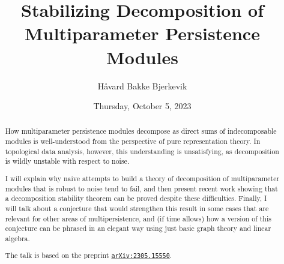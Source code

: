 \documentclass{UAmathtalk}
\author{Håvard Bakke Bjerkevik}
\title{Stabilizing Decomposition of Multiparameter Persistence Modules}
\date{Thursday, October 5, 2023}
\begin{document}
\maketitle

\begin{abstract}
How multiparameter persistence modules decompose as direct sums of indecomposable modules is well-understood from the perspective of pure representation theory. In topological data analysis, however, this understanding is unsatisfying, as decomposition is wildly unstable with respect to noise.

I will explain why naive attempts to build a theory of decomposition of multiparameter modules that is robust to noise tend to fail, and then present recent work showing that a decomposition stability theorem can be proved despite these difficulties. Finally, I will talk about a conjecture that would strengthen this result in some cases that are relevant for other areas of multipersistence, and (if time allows) how a version of this conjecture can be phrased in an elegant way using just basic graph theory and linear algebra.

The talk is based on the preprint \href{https://arxiv.org/abs/2305.15550}{\texttt{arXiv:2305.15550}}.
\end{abstract}
\end{document}
